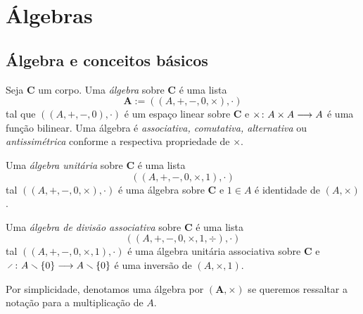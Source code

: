 \chapter{Álgebras}

\section{Álgebra e conceitos básicos}


\begin{definition}
Seja $\bm C$ um corpo. Uma \emph{álgebra} sobre $\bm C$ é uma lista
	\begin{equation*}
	\bm{A} := ((A,+,-,0,\times),\cdot)                                                                                                       \end{equation*}
tal que $((A,+,-,0),\cdot)$ é um espaço linear sobre $\bm C$ e ${\times}\colon {A \times A} \longrightarrow {A}$ é uma função bilinear. Uma álgebra é \emph{associativa, comutativa, alternativa} ou \emph{antissimétrica} conforme a respectiva propriedade de $\times$.

Uma \emph{álgebra unitária} sobre $\bm C$ é uma lista
	\begin{equation*}
	((A,+,-,0,\times,1),\cdot)
	\end{equation*}
tal $((A,+,-,0,\times),\cdot)$ é uma álgebra sobre $\bm C$ e $1 \in A$ é identidade de $(A,\times)$.

Uma \emph{álgebra de divisão associativa} sobre $\bm C$ é uma lista
	\begin{equation*}
	((A,+,-,0,\times,1,\div),\cdot)                                                                                                    \end{equation*}
tal $((A,+,-,0,\times,1),\cdot)$ é uma álgebra unitária associativa sobre $\bm C$ e $\fun{\div}{A \setminus \{0\}}{A \setminus \{0\}}$ é uma inversão de $(A,\times,1)$.
\end{definition}

Por simplicidade, denotamos uma álgebra por $(\bm A,\times)$ se queremos ressaltar a notação para a multiplicação de $A$.

